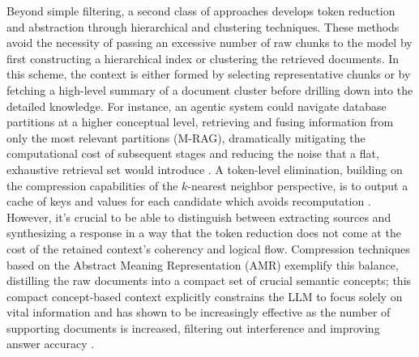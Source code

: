 \documentclass[11pt,a4paper]{article}
\begin{document}
Beyond simple filtering, a second class of approaches develops token reduction and abstraction through hierarchical and clustering techniques. These methods avoid the necessity of passing an excessive number of raw chunks to the model by first constructing a hierarchical index or clustering the retrieved documents. In this scheme, the context is either formed by selecting representative chunks or by fetching a high-level summary of a document cluster before drilling down into the detailed knowledge. For instance, an agentic system could navigate database partitions at a higher conceptual level, retrieving and fusing information from only the most relevant partitions (M-RAG), dramatically mitigating the computational cost of subsequent stages and reducing the noise that a flat, exhaustive retrieval set would introduce \cite{arxiv:2405.16420v1}. A token-level elimination, building on the compression capabilities of the \(k\)-nearest neighbor perspective, is to output a cache of keys and values for each candidate which avoids recomputation \cite{arxiv:2404.12457v2}. However, it's crucial to be able to distinguish between extracting sources and synthesizing a response in a way that the token reduction does not come at the cost of the retained context's coherency and logical flow. Compression techniques based on the Abstract Meaning Representation (AMR) exemplify this balance, distilling the raw documents into a compact set of crucial semantic concepts; this compact concept-based context explicitly constrains the LLM to focus solely on vital information and has shown to be increasingly effective as the number of supporting documents is increased, filtering out interference and improving answer accuracy \cite{arxiv:2405.03085v1}.
\end{document}
